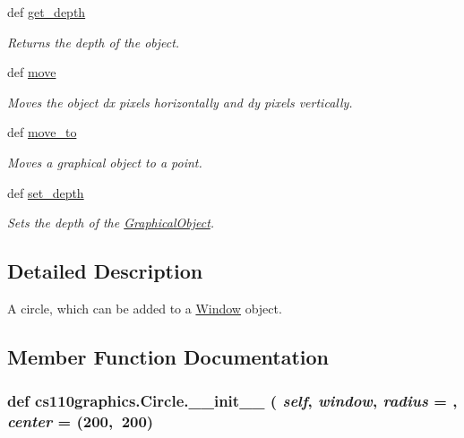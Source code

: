 \begin{DoxyCompactItemize}
def \hyperlink{classcs110graphics_1_1GraphicalObject_a6d9f5718cd0cf249e0d2842971bae17f}{get\_\-depth}
\begin{DoxyCompactList}\small\item\em Returns the depth of the object. \item\end{DoxyCompactList}\item 
def \hyperlink{classcs110graphics_1_1GraphicalObject_aa64d270fb83efa4a54e1a7953512f9cd}{move}
\begin{DoxyCompactList}\small\item\em Moves the object dx pixels horizontally and dy pixels vertically. \item\end{DoxyCompactList}\item 
def \hyperlink{classcs110graphics_1_1GraphicalObject_abe2d480265df7ac9447205c52c6946df}{move\_\-to}
\begin{DoxyCompactList}\small\item\em Moves a graphical object to a point. \item\end{DoxyCompactList}\item 
def \hyperlink{classcs110graphics_1_1GraphicalObject_a20d76d4ee4419c3065d61deb6cbc6700}{set\_\-depth}
\begin{DoxyCompactList}\small\item\em Sets the depth of the \hyperlink{classcs110graphics_1_1GraphicalObject}{GraphicalObject}. \item\end{DoxyCompactList}\end{DoxyCompactItemize}


\subsection{Detailed Description}
A circle, which can be added to a \hyperlink{classcs110graphics_1_1Window}{Window} object. 

\subsection{Member Function Documentation}
\hypertarget{classcs110graphics_1_1Circle_a7c92c173c0e9666d0682c48fbd170e9f}{
\subsubsection[{\_\-\_\-init\_\-\_\-}]{\setlength{\rightskip}{0pt plus 5cm}def cs110graphics.Circle.\_\-\_\-init\_\-\_\- ( {\em self}, \/   {\em window}, \/   {\em radius} = {}, \/   {\em center} = {\ttfamily (200,~200})}}
\label{classcs110graphics_1_1Circle_a7c92c173c0e9666d0682c48fbd170e9f}


